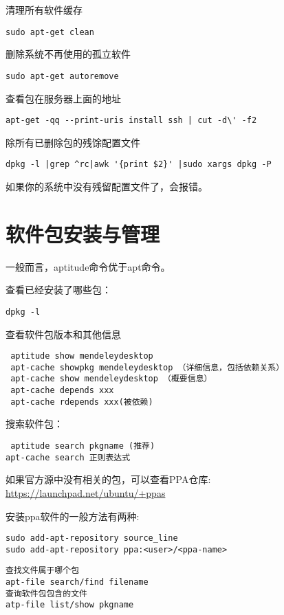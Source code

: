 清理所有软件缓存
\begin{verbatim}
sudo apt-get clean
\end{verbatim}

删除系统不再使用的孤立软件
\begin{verbatim}
sudo apt-get autoremove
\end{verbatim}

查看包在服务器上面的地址
\begin{verbatim}
apt-get -qq --print-uris install ssh | cut -d\' -f2
\end{verbatim}

除所有已删除包的残馀配置文件
\begin{verbatim}
dpkg -l |grep ^rc|awk '{print $2}' |sudo xargs dpkg -P 
\end{verbatim}
如果你的系统中没有残留配置文件了，会报错。

\section{软件包安装与管理}

一般而言，aptitude命令优于apt命令。

查看已经安装了哪些包：
\begin{verbatim}
dpkg -l
\end{verbatim}

查看软件包版本和其他信息
\begin{verbatim}
 aptitude show mendeleydesktop
 apt-cache showpkg mendeleydesktop （详细信息，包括依赖关系）
 apt-cache show mendeleydesktop （概要信息）
 apt-cache depends xxx
 apt-cache rdepends xxx(被依赖)
\end{verbatim}

搜索软件包：
\begin{verbatim}
 aptitude search pkgname (推荐)
apt-cache search 正则表达式
\end{verbatim}

如果官方源中没有相关的包，可以查看PPA仓库:
\url{https://launchpad.net/ubuntu/+ppas}

安装ppa软件的一般方法有两种:
\begin{verbatim}
sudo add-apt-repository source_line
sudo add-apt-repository ppa:<user>/<ppa-name>
\end{verbatim}

\begin{verbatim}
查找文件属于哪个包
apt-file search/find filename
查询软件包包含的文件
atp-file list/show pkgname
\end{verbatim}

